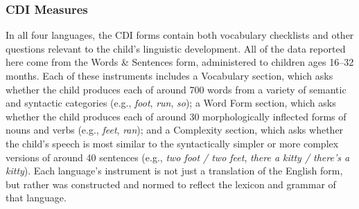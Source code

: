 \documentclass[10pt,letterpaper]{article}
\begin{document}

\subsubsection{CDI Measures}

In all four languages, the CDI forms contain both vocabulary checklists and other questions relevant to the child's linguistic development. All of the data reported here come from the Words \& Sentences form, administered to children ages 16--32 months. Each of these instruments includes a Vocabulary section, which asks whether the child produces each of around 700 words from a variety of semantic and syntactic categories (e.g., \emph{foot}, \emph{run}, \emph{so}); a Word Form section, which asks whether the child produces each of around 30 morphologically inflected forms of nouns and verbs (e.g., \emph{feet}, \emph{ran}); and a Complexity section, which asks whether the child's speech is most similar to the syntactically simpler or more complex versions of around 40 sentences (e.g., \emph{two foot / two feet}, \emph{there a kitty / there's a kitty}). Each language's instrument is not just a translation of the English form, but rather was constructed and normed to reflect the lexicon and grammar of that language.
\end{document}
